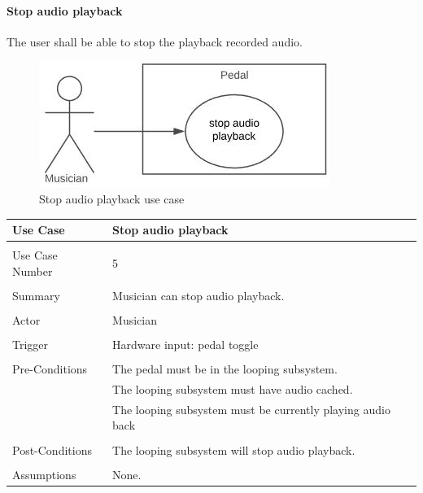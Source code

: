             \paragraph{Stop audio playback} 
            The user shall be able to stop the playback recorded audio.
            \begin{figure}[!ht]
                \centering
                \includegraphics[width=.5\textwidth]{diagrams/use_cases/uc-play-stop.JPG}
                \caption{Stop audio playback use case}
                \label{fig:uc-play-stop}
            \end{figure}
            \begin{table}[!ht]
                \centering
                \begin{tabular}{l l}
                    Use Case & Stop audio playback \\ 
                    \hline \\ 
                    Use Case Number & 5 \\ \\
                    Summary & Musician can stop audio playback. \\ \\
                    Actor & Musician \\ \\
                    Trigger & Hardware input: pedal toggle \\ \\
                    Pre-Conditions & The pedal must be in the looping subsystem. \\
                    & The looping subsystem must have audio cached. \\
                    & The looping subsystem must be currently playing audio back \\ \\
                    Post-Conditions & The looping subsystem will stop audio playback. \\ \\
                    Assumptions & None.\\
                \end{tabular}
            \end{table}
            
